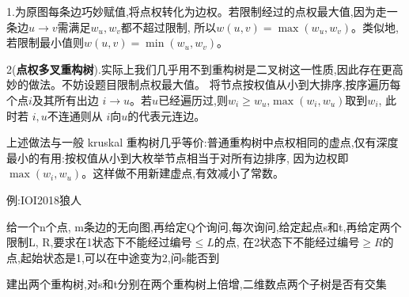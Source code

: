 \documentclass[a4paper, fontset=none]{ctexart}
\begin{document}
1.为原图每条边巧妙赋值,将点权转化为边权。若限制经过的点权最大值,因为走一条边$u\rightarrow v$需满足$w_u, w_v$都不超过限制,
所以$w(u, v)=\max(w_u, w_v)$。类似地,若限制最小值则$w(u, v)=\min(w_u, w_v)$。

2(\textbf{点权多叉重构树}).实际上我们几乎用不到重构树是二叉树这一性质,因此存在更高妙的做法。不妨设题目限制点权最大值。
将节点按权值从小到大排序,按序遍历每个点$i$及其所有出边 $i\rightarrow u$。若$u$已经遍历过,则$w_i\ge w_u$,$\max(w_i, w_u)$取到$w_i$,
此时若 $i, u$不连通则从 $i$向$u$的代表元连边。

上述做法与一般 kruskal 重构树几乎等价:普通重构树中点权相同的虚点,仅有深度最小的有用:按权值从小到大枚举节点相当于对所有边排序,
因为边权即 $\max(w_i, w_u)$。这样做不用新建虚点,有效减小了常数。

例:IOI2018狼人

给一个n个点, m条边的无向图,再给定Q个询问,每次询问,给定起点s和t,再给定两个限制L, R,要求在1状态下不能经过编号$\leqslant L$的点,
在2状态下不能经过编号$\ge R$的点,起始状态是1,可以在中途变为2,问s能否到

建出两个重构树,对s和t分别在两个重构树上倍增,二维数点两个子树是否有交集
\end{document}
